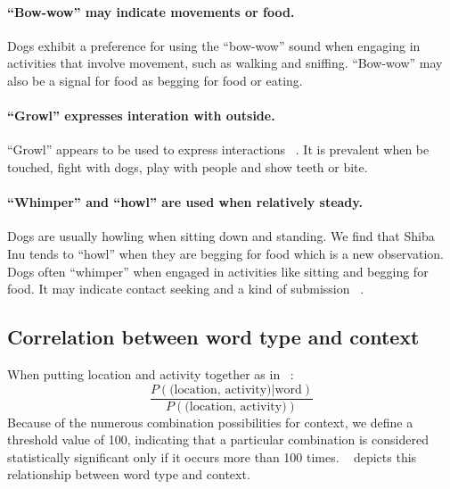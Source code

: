 \paragraph{``Bow-wow'' may indicate movements or food.} Dogs exhibit a preference for using the ``bow-wow'' sound when engaging in activities that involve movement, such as walking and sniffing. ``Bow-wow'' may also be a signal for food as begging for food or eating. 
\paragraph{``Growl'' expresses interation with outside.}
``Growl'' appears to be used to express interactions ~\cite{handelman2012canine}. It is prevalent when be touched, fight with dogs, play with people and show teeth or bite. 
\paragraph{``Whimper'' and ``howl'' are used when relatively steady.}
Dogs are usually howling when sitting down and standing. We find that Shiba Inu tends to ``howl'' when they are begging for food which is a new observation. 
Dogs often ``whimper'' when engaged in activities like sitting and begging for food. It may indicate contact seeking and a kind of submission ~\cite{pongracz2010barking}. 



\subsection{Correlation between word type and context}
When putting location and activity together as in ~:
\begin{equation}
\frac{P (\text{(location, activity)}| \text{word})}{P(\text{(location, activity)})}
\end{equation}
Because of the numerous combination possibilities for context, we define a threshold value of 100, indicating that a particular combination is considered statistically significant only if it occurs more than 100 times. ~ depicts this relationship between word type and context.
